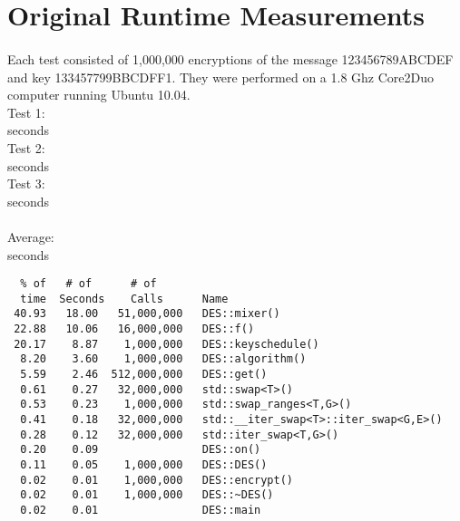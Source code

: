 \documentclass[10pt]{article}
\begin{document}
\section{Original Runtime Measurements}
\paragraph{}Each test consisted of 1,000,000 encryptions of the message 123456789ABCDEF and key 133457799BBCDFF1. They were performed on a 1.8 Ghz Core2Duo computer running Ubuntu 10.04.
\\Test 1:
\\  seconds
\\Test 2:
\\  seconds
\\Test 3:
\\  seconds
\\\\Average:
\\  seconds
\begin{verbatim}
  % of   # of      # of                
  time  Seconds    Calls      Name    
 40.93   18.00   51,000,000   DES::mixer()
 22.88   10.06   16,000,000   DES::f()
 20.17    8.87    1,000,000   DES::keyschedule()
  8.20    3.60    1,000,000   DES::algorithm()
  5.59    2.46  512,000,000   DES::get()
  0.61    0.27   32,000,000   std::swap<T>()
  0.53    0.23    1,000,000   std::swap_ranges<T,G>()
  0.41    0.18   32,000,000   std::__iter_swap<T>::iter_swap<G,E>()
  0.28    0.12   32,000,000   std::iter_swap<T,G>()
  0.20    0.09                DES::on()
  0.11    0.05    1,000,000   DES::DES()
  0.02    0.01    1,000,000   DES::encrypt()
  0.02    0.01    1,000,000   DES::~DES()
  0.02    0.01                DES::main
\end{verbatim}
\end{document}

